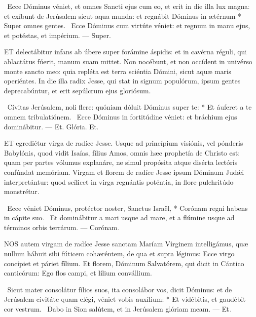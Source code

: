 \R\ Ecce Dóminus véniet, et omnes Sancti ejus cum eo, et erit in die illa lux magna: et exíbunt de Jerúsalem sicut aqua munda: et regnábit Dóminus in ætérnum * Super omnes gentes. \V\ Ecce Dóminus cum virtúte véniet: et regnum in manu ejus, et potéstas, et impérium. --- Super.


\lettrine[lines=2]{E}{T} delectábitur infans ab úbere super forámine áspidis: et in cavérna réguli, qui ablactátus fúerit, manum suam mittet. Non nocébunt, et non occídent in univérso monte sancto meo: quia repléta est terra sciéntia Dómini, sicut aquæ maris operiéntes. In die illa radix Jesse, qui stat in signum populórum, ipsum gentes deprecabúntur, et erit sepúlcrum ejus gloriósum.

\R\ Cívitas Jerúsalem, noli flere: quóniam dóluit Dóminus super te: * Et áuferet a te omnem tribulatiónem. \V\ Ecce Dóminus in fortitúdine véniet: et bráchium ejus dominábitur. --- Et. Glória. Et.





\lettrine[lines=2]{E}{T} egrediétur virga de radíce Jesse. Usque ad princípium visiónis, vel pónderis Babylónis, quod vidit Isaías, fílius Amos, omnis hæc prophetía de Christo est: quam per partes vólumus explanáre, ne simul propósita atque disérta lectóris confúndat memóriam. Virgam et florem de radíce Jesse ipsum Dóminum Judǽi interpretántur: quod scílicet in virga regnántis poténtia, in flore pulchritúdo monstrétur.

\R\ Ecce véniet Dóminus, protéctor noster, Sanctus Israël, * Corónam regni habens in cápite suo. \V\ Et dominábitur a mari usque ad mare, et a flúmine usque ad términos orbis terrárum. --- Corónam.


\lettrine[lines=2]{N}{OS} autem virgam de radíce Jesse sanctam Maríam Vírginem intelligámus, quæ nullum hábuit sibi fúticem cohæréntem, de qua et supra légimus: Ecce virgo concípiet et páriet fílium. Et florem, Dóminum Salvatórem, qui dicit in Cántico canticórum: Ego flos campi, et lílium convállium.

\R\ Sicut mater consolátur fílios suos, ita consolábor vos, dicit Dóminus: et de Jerúsalem civitáte quam elégi, véniet vobis auxílium: * Et vidébitis, et gaudébit cor vestrum. \V\ Dabo in Sion salútem, et in Jerúsalem glóriam meam. --- Et.

